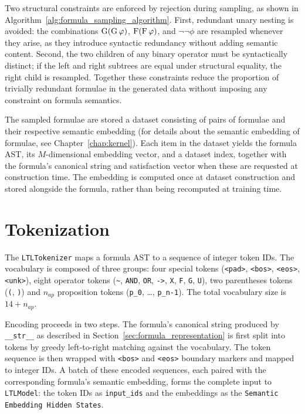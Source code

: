 \documentclass[titlepage,a4paper,11pt]{report}
\begin{document}
    
    Two structural constraints are enforced by rejection during sampling, as shown in Algorithm~\ref{alg:formula_sampling_algorithm}. First, redundant unary nesting is avoided: the combinations $\text{G}(\text{G}\,\varphi)$, $\text{F}(\text{F}\,\varphi)$, and $\neg\neg\phi$ are resampled whenever they arise, as they introduce syntactic redundancy without adding semantic content. Second, the two children of any binary operator must be syntactically distinct; if the left and right subtrees are equal under structural equality, the right child is resampled. Together these constraints reduce the proportion of trivially redundant formulae in the generated data without imposing any constraint on formula semantics.
    
    The sampled formulae are stored a dataset consisting of pairs of formulae and their respective semantic embedding (for details about the semantic embedding of formulae, see Chapter~\ref{chap:kernel}). Each item in the dataset yields the formula AST, its $M$-dimensional embedding vector, and a dataset index, together with the formula's canonical string and satisfaction vector when these are requested at construction time. The embedding is computed once at dataset construction and stored alongside the formula, rather than being recomputed at training time.

    \section{Tokenization}
    The \texttt{LTLTokenizer} maps a formula AST to a sequence of integer token IDs. The vocabulary is composed of three groups: four special tokens (\texttt{<pad>}, \texttt{<bos>}, \texttt{<eos>}, \texttt{<unk>}), eight operator tokens (\texttt{\textasciitilde}, \texttt{AND}, \texttt{OR}, \texttt{->}, \texttt{X}, \texttt{F}, \texttt{G}, \texttt{U}), two parentheses tokens (\texttt{(}, \texttt{)}) and $n_{ap}$ proposition tokens (\texttt{p\_0}, \ldots, \texttt{p\_{n-1}}). The total vocabulary size is $14 + n_{ap}$.
    
    Encoding proceeds in two steps. The formula's canonical string produced by \texttt{\_\_str\_\_} as described in Section~\ref{sec:formula_representation} is first split into tokens by greedy left-to-right matching against the vocabulary. The token sequence is then wrapped with \texttt{<bos>} and \texttt{<eos>} boundary markers and mapped to integer IDs. A batch of these encoded sequences, each paired with the corresponding formula's semantic embedding, forms the complete input to \texttt{LTLModel}: the token IDs as \texttt{input\_ids} and the embeddings as the \texttt{Semantic Embedding Hidden States}.
\end{document}

